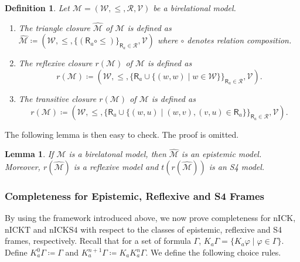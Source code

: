 \documentclass{myifcolog}
\newcommand{\K}{K}
\newcommand\R{\mathsf{R}}
\newcommand{\agi}{a}
\newcommand{\fw}{\mathcal{M}}
\newcommand{\W}{\mathcal{W}}
\newcommand{\rel}{\mathcal{R}}
\newcommand{\V}{\mathcal{V}}
\newcommand{\nick}{\mathrm{nICK}}
\newcommand{\nickt}{\mathrm{nICKT}}
\newcommand{\nicks}{\mathrm{nICKS4}}
\newtheorem{definition}[theorem]{Definition}
\newtheorem{lemma}[theorem]{Lemma}
\numberwithin{theorem}{section}
\begin{document}
\begin{definition}
    Let $\fw=(\W, \leq, \rel, \V)$ be a birelational model.
    \begin{enumerate}
        \item The \emph{triangle closure} $\hat{\fw}$ of $\fw$ is defined as $\hat{\fw} \coloneqq (\W, \leq, \{(\R_\agi \circ \leq)\}_{\R_\agi \in \rel}, \V)$ where $\circ$ denotes relation composition.
        \item The \emph{reflexive closure} $r(\fw)$ of $\fw$ is defined as 
        \begin{equation*}
            {r(\fw) \coloneqq (\W, \leq, \{\R_\agi \cup \{(w,w) \mid w \in \W\}\}_{\R_\agi \in \rel}, \V)}.
        \end{equation*}
        \item The \emph{transitive closure} $r(\fw)$ of $\fw$ is defined as 
        \begin{equation*}
            {r(\fw) \coloneqq (\W, \leq, \{\R_\agi \cup \{(w,u) \mid (w,v), (v,u) \in \R_\agi\}\}_{\R_\agi \in \rel}, \V)}.
        \end{equation*}
    \end{enumerate}
\end{definition}

The following lemma is then easy to check. The proof is omitted.

\begin{lemma}\label{l: model operations}
    If $\fw$ is a birelatonal model, then $\hat{\fw}$ is an epistemic model. Moreover, $r(\hat{\fw})$ is a reflexive model and $t(r(\hat{\fw}))$ is an S4 model.
\end{lemma}




\subsubsection{Completeness for Epistemic, Reflexive and  S4 Frames}\label{ss: completeness for epistemic, reflexive and s4 frames}
By using the framework introduced above, we now prove completeness for $\nick$, $\nickt$ and $\nicks$ with respect to the classes of epistemic, reflexive and S4 frames, respectively. Recall that for a set of formula $\Gamma$, $\K_\agi \Gamma = \{ \K_\agi \varphi \mid \varphi \in \Gamma\}$. Define $\K_\agi^0 \Gamma \coloneqq \Gamma$ and $\K_\agi^{n+1} \Gamma \coloneqq \K_\agi \K_\agi^n \Gamma$. We define the following choice rules.
\end{document}
